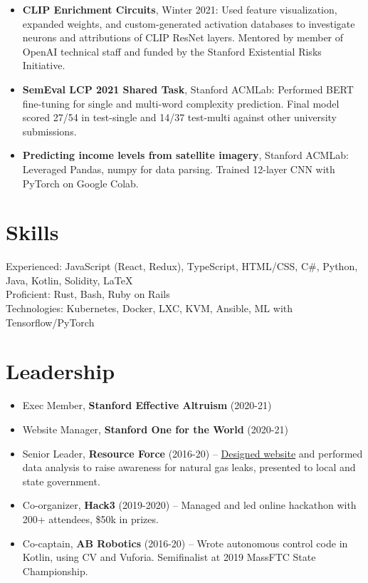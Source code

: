 \documentclass[letterpaper,11pt]{article}
\begin{document}
\begin{itemize}[label=--]
     \item \textbf{CLIP Enrichment Circuits}, Winter 2021: Used feature visualization, expanded weights, and custom-generated activation databases to investigate neurons and attributions of CLIP ResNet layers. Mentored by member of OpenAI technical staff and funded by the Stanford Existential Risks Initiative.
     \item \textbf{SemEval LCP 2021 Shared Task}, Stanford ACMLab: Performed BERT fine-tuning for single and multi-word complexity prediction. Final model scored 27/54 in test-single and 14/37 test-multi against other university submissions.
     \item \textbf{Predicting income levels from satellite imagery}, Stanford ACMLab:
           Leveraged Pandas, numpy for data parsing. Trained 12-layer CNN with PyTorch on
           Google Colab.
\end{itemize}

\section{Skills}

Experienced: JavaScript (React, Redux), TypeScript, HTML/CSS, C\#,
Python, Java, Kotlin, Solidity, \LaTeX\\
Proficient: Rust, Bash, Ruby on Rails\\
Technologies: Kubernetes, Docker, LXC, KVM, Ansible, ML with
Tensorflow/PyTorch

\section{Leadership}

\begin{itemize}[label=--]
     \item Exec Member, \textbf{Stanford Effective Altruism} (2020-21)
     \item Website Manager, \textbf{Stanford One for the World} (2020-21)
     \item Senior Leader, \textbf{Resource Force} (2016-20) --
           \href{https://gasleaks.info}{Designed website} and performed data analysis to raise awareness for natural gas leaks, presented to local and state
           government.
     \item Co-organizer, \textbf{Hack3} (2019-2020) -- Managed and led online hackathon
           with 200+ attendees, \$50k in prizes.
     \item Co-captain, \textbf{AB Robotics} (2016-20) -- Wrote autonomous control code in
           Kotlin, using CV and Vuforia. Semifinalist at 2019 MassFTC State Championship.
\end{itemize}
\end{document}
